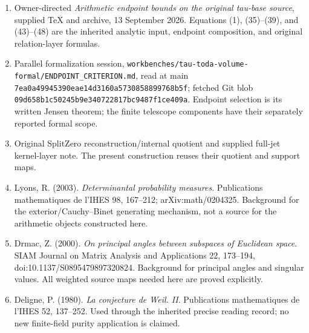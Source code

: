 \documentclass[
  11pt,
]{article}
\providecommand{\tightlist}{%
  \setlength{\itemsep}{0pt}\setlength{\parskip}{0pt}}
\begin{document}
\begin{enumerate}
\def\labelenumi{\arabic{enumi}.}
\tightlist
\item
  Owner-directed \emph{Arithmetic endpoint bounds on the original
  tau-base source}, supplied TeX and archive, 13 September 2026.
  Equations (1), (35)--(39), and (43)--(48) are the inherited analytic
  input, endpoint composition, and original relation-layer formulas.
\item
  Parallel formalization session,
  \texttt{workbenches/tau-toda-volume-formal/ENDPOINT\_CRITERION.md},
  read at main \texttt{7ea0a49945390eae14d3160a5730858899768b5f};
  fetched Git blob \texttt{09d658b1c50245b9e340722817bc9487f1ce409a}.
  Endpoint selection is its written Jensen theorem; the finite telescope
  components have their separately reported formal scope.
\item
  Original SplitZero reconstruction/internal quotient and supplied
  full-jet kernel-layer note. The present construction reuses their
  quotient and support maps.
\item
  Lyons, R. (2003). \emph{Determinantal probability measures}.
  Publications mathematiques de l'IHES 98, 167--212; arXiv:math/0204325.
  Background for the exterior/Cauchy--Binet generating mechanism, not a
  source for the arithmetic objects constructed here.
\item
  Drmac, Z. (2000). \emph{On principal angles between subspaces of
  Euclidean space}. SIAM Journal on Matrix Analysis and Applications 22,
  173--194, doi:10.1137/S0895479897320824. Background for principal
  angles and singular values. All weighted source maps needed here are
  proved explicitly.
\item
  Deligne, P. (1980). \emph{La conjecture de Weil. II}. Publications
  mathematiques de l'IHES 52, 137--252. Used through the inherited
  precise reading record; no new finite-field purity application is
  claimed.
\end{enumerate}
\end{document}
